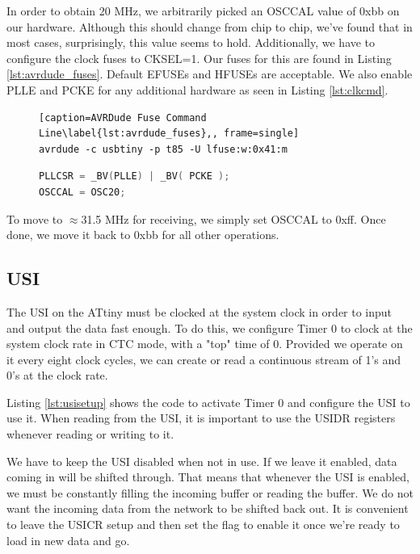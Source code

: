 \documentclass[13pt]{ltxdoc}
\begin{document}
In order to obtain 20 MHz, we arbitrarily picked an OSCCAL value of 0xbb on our
hardware.  Although this should change from chip to chip, we've found that in most
cases, surprisingly, this value seems to hold.  Additionally, we have to configure
the clock fuses to CKSEL=1.  Our fuses for this are found in Listing \ref{lst:avrdude_fuses}.
Default EFUSEs and HFUSEs are acceptable.  We also enable PLLE and PCKE for any additional
hardware as seen in Listing \ref{lst:clkcmd}.

\begin{figure}
\begin{lstlisting}[caption=AVRDude Fuse Command Line\label{lst:avrdude_fuses},, frame=single]
avrdude -c usbtiny -p t85 -U lfuse:w:0x41:m
\end{lstlisting}
\end{figure}

\begin{figure}
\begin{lstlisting}[caption=Clock Setup\label{lst:clkcmd},language=C, frame=single]
PLLCSR = _BV(PLLE) | _BV( PCKE );
OSCCAL = OSC20;
\end{lstlisting}
\end{figure}


To move to $\approx$31.5 MHz for receiving, we simply set OSCCAL to 0xff.  Once done, we move it back to 0xbb for all other operations.

\subsection{USI}
The USI on the ATtiny must be clocked at the system clock in order to input and output the data fast enough.
To do this, we configure Timer 0 to clock at the system clock rate in CTC mode, with a "top" time of 0.
Provided we operate on it every eight clock cycles, we can create or read
a continuous stream of 1's and 0's at the clock rate.

Listing \ref{lst:usisetup} shows the code to activate Timer 0 and configure the USI to use it. 
When reading from the USI, it is important to use the USIDR registers whenever reading or writing to it.

We have to keep the USI disabled when not in use.  If we leave it enabled, data coming in will be shifted through.  
That means that whenever the USI is enabled, we must be constantly filling the incoming buffer or reading the buffer.
We do not want the incoming data from the network to be shifted back out.  It is convenient to leave the USICR setup and then
set the flag to enable it once we're ready to load in new data and go.
\end{document}

